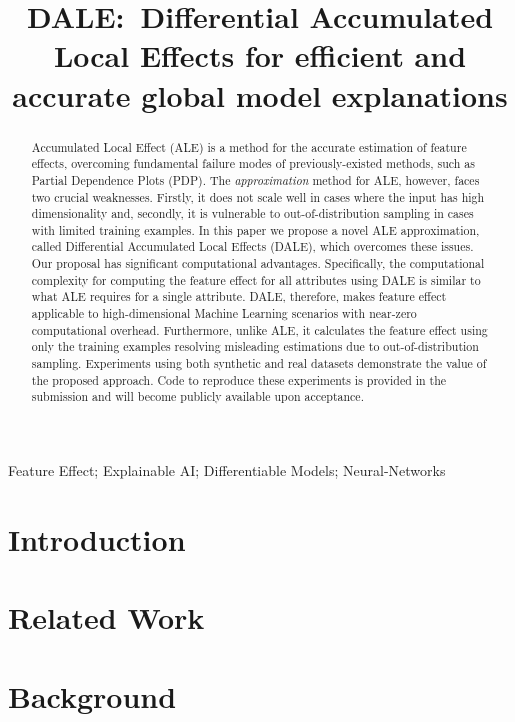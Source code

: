 \documentclass[wcp]{jmlr}
\title[DALE:~Differential Accumulated Local Effects]{DALE:~Differential Accumulated Local Effects for efficient and accurate global model explanations}
\begin{document}
\maketitle

\begin{abstract}
  Accumulated Local Effect (ALE) is a method for the accurate
  estimation of feature effects, overcoming fundamental failure modes
  of previously-existed methods, such as Partial Dependence Plots
  (PDP). The \textit{approximation} method for ALE, however, faces two
  crucial weaknesses. Firstly, it does not scale well in cases where
  the input has high dimensionality and, secondly, it is vulnerable to
  out-of-distribution sampling in cases with limited training
  examples. In this paper we propose a novel ALE approximation, called
  Differential Accumulated Local Effects (DALE), which overcomes these
  issues. Our proposal has significant computational
  advantages. Specifically, the computational complexity for computing
  the feature effect for all attributes using DALE is similar to what
  ALE requires for a single attribute. DALE, therefore, makes feature
  effect applicable to high-dimensional Machine Learning scenarios
  with near-zero computational overhead. Furthermore, unlike ALE, it
  calculates the feature effect using only the training examples
  resolving misleading estimations due to out-of-distribution
  sampling. Experiments using both synthetic and real datasets
  demonstrate the value of the proposed approach. Code to reproduce
  these experiments is provided in the submission and will become
  publicly available upon acceptance.
\end{abstract}
\begin{keywords}
Feature Effect; Explainable AI; Differentiable Models; Neural-Networks
\end{keywords}

\section{Introduction}

\label{sec:1-introduction}

\section{Related Work}

\label{sec:2-related}

\section{Background}

\label{sec:3-feature-effect}
\end{document}
